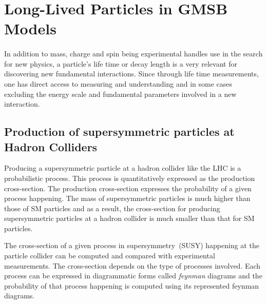 {\section{Long-Lived Particles in GMSB Models}
\paragraph*{}
In addition to mass, charge and spin being experimental handles use in the search for new physics, a particle's life time or decay length is a very relevant for discovering new fundamental interactions. Since through life time measurements, one has direct access to measuring and understanding and in some cases excluding the energy scale and fundamental parameters involved in a new interaction.
\subsection{Production of supersymmetric particles at Hadron Colliders}
Producing a supersymmetric particle at a hadron collider like the LHC is a probabilistic process. This process is quantitatively expressed as the production cross-section. The production cross-section expresses the probability of a given process happening. 
The mass of supersymmetric particles is much higher than those of SM particles and as a result, the cross-section for producing supersymmetric particles at a hadron collider is much smaller than that for SM particles.

The cross-section of a given process in supersymmetry~(SUSY) happening at the particle collider can be computed and compared with experimental measurements. The cross-section depends on the type of processes involved. Each process can be expressed in diagrammatic forms called \textit{feynman} diagrams and the probability of that process happening is computed using its represented feynman diagrams.

}
